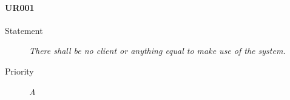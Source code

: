 \paragraph{UR001}
  \begin{description}
  \item [Statement] 
    \textit{ There shall be no client or anything equal to make use of the system.}
  \item [Priority] \textit{A}
\end{description}